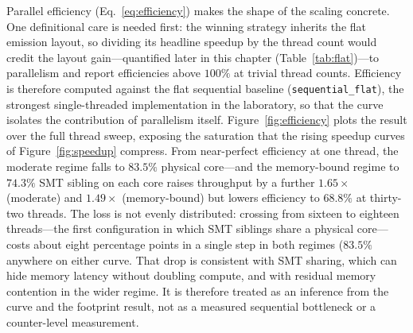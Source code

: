 Parallel efficiency (Eq.~\ref{eq:efficiency}) makes the shape of the scaling
concrete. One definitional care is needed first: the winning strategy inherits
the flat emission layout, so dividing its headline speedup by the thread count
would credit the layout gain---quantified later in this chapter
(Table~\ref{tab:flat})---to parallelism and report efficiencies above $100\%$
at trivial thread counts. Efficiency is therefore computed against the flat
sequential baseline (\texttt{sequential\_flat}), the strongest single-threaded
implementation in the laboratory, so that the curve isolates the contribution
of parallelism itself. Figure~\ref{fig:efficiency} plots the result over the
full thread sweep, exposing the saturation that the rising speedup curves of
Figure~\ref{fig:speedup} compress. From near-perfect efficiency at one thread,
the moderate regime falls to $83.5\%$
physical core---and the memory-bound regime to $74.3\%$
SMT sibling on each core raises throughput by a further $1.65\times$ (moderate)
and $1.49\times$ (memory-bound) but lowers efficiency to $68.8\%$
at thirty-two threads. The loss is not evenly distributed: crossing from
sixteen to eighteen threads---the first configuration in which SMT siblings
share a physical core---costs about eight percentage points in a single step in
both regimes ($83.5\%$
anywhere on either curve. That drop is consistent with SMT sharing, which can
hide memory latency without doubling compute, and with residual memory
contention in the wider regime. It is therefore treated as an inference from
the curve and the footprint result, not as a measured sequential bottleneck or
a counter-level measurement.

